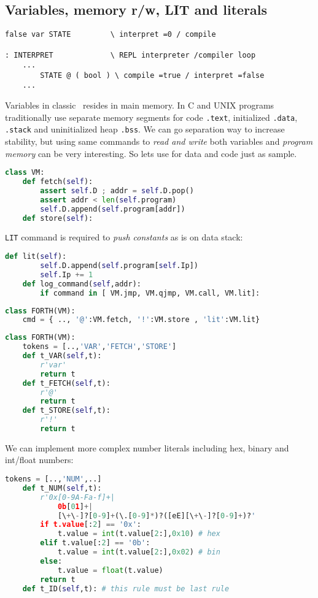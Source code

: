 \clearpage
\subsection{Variables, memory r/w, LIT and literals}

\begin{lstlisting}[language=Forth]
false var STATE			\ interpret =0 / compile 

: INTERPRET				\ REPL interpreter /compiler loop
	...
		STATE @ ( bool ) \ compile =true / interpret =false
	...  
\end{lstlisting}
Variables in classic \F\ resides in main memory. In C and UNIX
programs traditionally use separate
memory segments for code \verb|.text|, initialized \verb|.data|, \verb|.stack|
and uninitialized heap \verb|.bss|. We can go separation way to increase
stability, but using same commands to \emph{read and write} both variables and
\emph{program memory} can be very interesting. So lets use  for data and code just as sample. 

\begin{lstlisting}[language=Python]
class VM:
	def fetch(self):
		assert self.D ; addr = self.D.pop()
		assert addr < len(self.program)
		self.D.append(self.program[addr])
	def store(self):
\end{lstlisting}
\verb|LIT| command is required to \emph{push constants} as is on data stack:
\begin{lstlisting}[language=Python]
	def lit(self):
		self.D.append(self.program[self.Ip])
		self.Ip += 1
	def log_command(self,addr):
		if command in [ VM.jmp, VM.qjmp, VM.call, VM.lit]:
\end{lstlisting}
\begin{lstlisting}[language=Python]
class FORTH(VM):
	cmd = { .., '@':VM.fetch, '!':VM.store , 'lit':VM.lit} 		
\end{lstlisting}

\begin{lstlisting}[language=Python]
class FORTH(VM):
	tokens = [..,'VAR','FETCH','STORE']
 	def t_VAR(self,t):
 		r'var'
 		return t
 	def t_FETCH(self,t):
 		r'@'
 		return t
 	def t_STORE(self,t):
 		r'!'
 		return t
\end{lstlisting}
We can implement more complex number literals including hex, binary and
int/float numbers:
 \begin{lstlisting}[language=Python]
	tokens = [..,'NUM',..]
 	def t_NUM(self,t):
		r'0x[0-9A-Fa-f]+|
			0b[01]+|
			[\+\-]?[0-9]+(\.[0-9]*)?([eE][\+\-]?[0-9]+)?'
  		if t.value[:2] == '0x':
  			t.value = int(t.value[2:],0x10) # hex
  		elif t.value[:2] == '0b':
  			t.value = int(t.value[2:],0x02) # bin
  		else:
  			t.value = float(t.value)
 		return t
 	def t_ID(self,t): # this rule must be last rule
\end{lstlisting}

